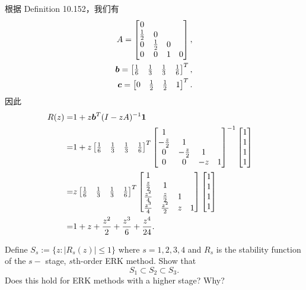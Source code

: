 \documentclass[lang=cn,a4paper,newtx,bibend=bibtex]{elegantpaper}
\begin{document}
\begin{solution}
  根据 Definition 10.152，我们有
  \begin{equation*}
    \begin{aligned}
        A = \begin{bmatrix} 
        0 \\
        \frac 12 & 0 \\
        0 & \frac 12 & 0 \\
        0 & 0 & 1 & 0 \\
       \end{bmatrix},\\
      \bm{b} = \begin{bmatrix} \frac 16 & \frac 13 & \frac 13 & \frac 16 \end{bmatrix}^T, \\
      \bm{c} = \begin{bmatrix} 0 & \frac 12 & \frac 12 & 1 \end{bmatrix}^T.
    \end{aligned}
  \end{equation*}
  因此
  \begin{equation*}
    \begin{aligned}
      R(z) = & 1 + z\bm{b}^T(I - zA)^{-1}\bm{1} & \\
      = & 1 + z \begin{bmatrix} \frac 16 & \frac 13 & \frac 13 & \frac 16 \end{bmatrix}^T
      \begin{bmatrix} 
        1 \\
        -\frac z2 & 1 \\
        0 & -\frac z2 & 1 \\
        0 & 0 & -z & 1 \\
       \end{bmatrix}^{-1}
      \begin{bmatrix} 
        1 \\ 1 \\ 1 \\ 1 \\
       \end{bmatrix} & \\
      = & z \begin{bmatrix} \frac 16 & \frac 13 & \frac 13 & \frac 16 \end{bmatrix}^T
      \begin{bmatrix} 
        1 \\
        \frac z2 & 1 \\
        \frac {z^2}4 & \frac z2 & 1 \\
        \frac {z^3}4 & \frac {z^2}2 & z & 1 \\
       \end{bmatrix}
      \begin{bmatrix} 
        1 \\ 1 \\ 1 \\ 1 \\
       \end{bmatrix} & \\
      = & 1 + z + \frac {z^2}2 + \frac {z^3}6 + \frac {z^4}{24}.
    \end{aligned}
  \end{equation*}
\end{solution}

\begin{prob}[Exercise 10.206]
  Define $S_s := \{z: |R_s(z)|\leq 1\}$ where $s = 1,2,3,4$ and $R_s$ is the stability function of the
  $s-$ stage, $s$th-order ERK method. Show that
  \begin{equation*}
    S_1 \subset S_2 \subset S_3.
  \end{equation*}
  Does this hold for ERK methods with a higher stage? Why?
\end{prob}
\end{document}
